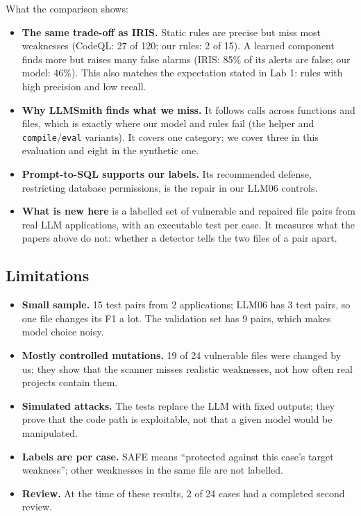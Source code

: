 \documentclass[11pt,a4paper]{article}
\newcommand{\code}[1]{\texttt{#1}}
\begin{document}
What the comparison shows:
\begin{itemize}
  \item \textbf{The same trade-off as IRIS.} Static rules are precise but miss most
        weaknesses (CodeQL: 27 of 120; our rules: 2 of 15). A learned component finds more
        but raises many false alarms (IRIS: 85\% of its alerts are false; our model: 46\%).
        This also matches the expectation stated in Lab 1: rules with high precision and
        low recall.
  \item \textbf{Why LLMSmith finds what we miss.} It follows calls across functions and
        files, which is exactly where our model and rules fail (the helper and
        \code{compile}/\code{eval} variants). It covers one category; we cover three in
        this evaluation and eight in the synthetic one.
  \item \textbf{Prompt-to-SQL supports our labels.} Its recommended defense, restricting
        database permissions, is the repair in our LLM06 controls.
  \item \textbf{What is new here} is a labelled set of vulnerable and repaired file pairs
        from real LLM applications, with an executable test per case. It measures what the
        papers above do not: whether a detector tells the two files of a pair apart.
\end{itemize}

\subsection{Limitations}

\begin{itemize}
  \item \textbf{Small sample.} 15 test pairs from 2 applications; LLM06 has 3 test pairs, so
        one file changes its F1 a lot. The validation set has 9 pairs, which makes model
        choice noisy.
  \item \textbf{Mostly controlled mutations.} 19 of 24 vulnerable files were changed by us;
        they show that the scanner misses realistic weaknesses, not how often real
        projects contain them.
  \item \textbf{Simulated attacks.} The tests replace the LLM with fixed outputs; they prove
        that the code path is exploitable, not that a given model would be manipulated.
  \item \textbf{Labels are per case.} SAFE means ``protected against this case's target
        weakness''; other weaknesses in the same file are not labelled.
  \item \textbf{Review.} At the time of these results, 2 of 24 cases had a completed
        second review.
\end{itemize}
\end{document}
